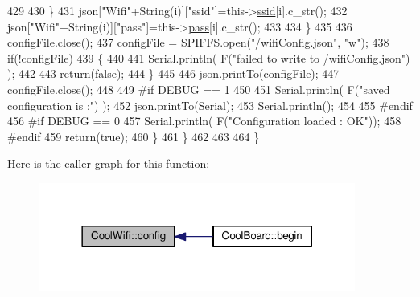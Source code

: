 \begin{DoxyCode}
429                     
430                 \}
431                 json[\textcolor{stringliteral}{"Wifi"}+String(i)][\textcolor{stringliteral}{"ssid"}]=this->\hyperlink{class_cool_wifi_a893b21d0fed821438733bba2e73fb4c2}{ssid}[i].c\_str();
432                 json[\textcolor{stringliteral}{"Wifi"}+String(i)][\textcolor{stringliteral}{"pass"}]=this->\hyperlink{class_cool_wifi_a0c3332a149245aaad060b32593a54c9b}{pass}[i].c\_str();           
433                         
434             \}
435 
436             configFile.close();
437             configFile = SPIFFS.open(\textcolor{stringliteral}{"/wifiConfig.json"}, \textcolor{stringliteral}{"w"});
438             \textcolor{keywordflow}{if}(!configFile)
439             \{
440             
441                 Serial.println( F(\textcolor{stringliteral}{"failed to write to /wifiConfig.json"}) );
442             
443                 \textcolor{keywordflow}{return}(\textcolor{keyword}{false});              
444             \}
445             
446             json.printTo(configFile);
447             configFile.close();
448 
449 \textcolor{preprocessor}{        #if DEBUG == 1 }
450 
451             Serial.println( F(\textcolor{stringliteral}{"saved configuration is :"}) );
452             json.printTo(Serial);
453             Serial.println();
454         
455 \textcolor{preprocessor}{        #endif}
456 \textcolor{preprocessor}{        #if DEBUG == 0}
457             Serial.println( F(\textcolor{stringliteral}{"Configuration loaded : OK"}));
458 \textcolor{preprocessor}{        #endif}
459             \textcolor{keywordflow}{return}(\textcolor{keyword}{true}); 
460         \}
461     \}   
462     
463 
464 \}
\end{DoxyCode}
Here is the caller graph for this function\+:\nopagebreak
\begin{figure}[H]
\begin{center}
\leavevmode
\includegraphics[width=294pt]{d7/d29/class_cool_wifi_a4eb2f6b9b09dd588964b88b6c70122c0_icgraph}
\end{center}
\end{figure}
\mbox{\label{class_cool_wifi_a2a9a546f76816c8c5c8e2d46a6c4f07d}} 
